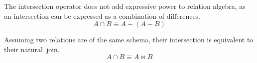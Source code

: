 The intersection operator does not add expressive power to relation algebra, as an intersection can be expressed as a combination of differences.
\begin{equation*}
  A \cap B \equiv A - \left( A - B \right)
\end{equation*}

Assuming two relations are of the same schema, their intersection is equivalent to their natural~join.
\begin{equation*}
  A \cap B \equiv A \bowtie B
\end{equation*}
